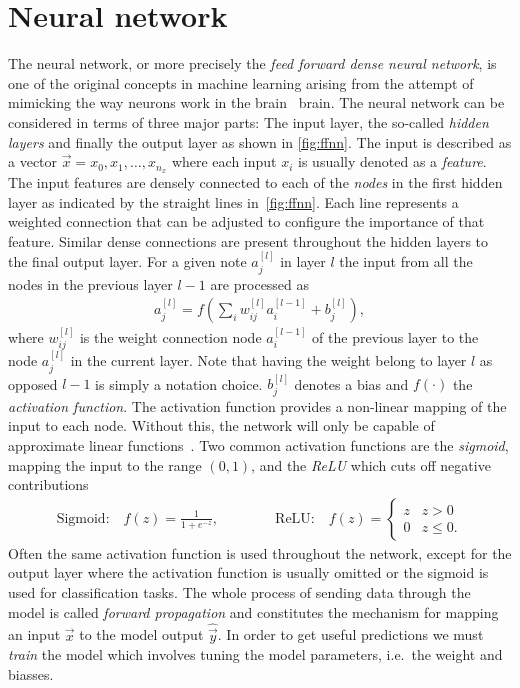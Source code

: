\section{Neural network}\label{sec:NN}
The neural network, or more precisely the \textit{feed forward dense neural
network}, is one of the original concepts in machine learning arising from the attempt of mimicking the way neurons work in the brain~\cite{lederer2021activation, Shankar_2022} brain. The neural network can be considered in terms of three major parts: The input layer, the
so-called \textit{hidden layers} and finally the output layer as shown in
\cref{fig:ffnn}. The input is described as a vector $\vec{x} = x_0, x_1, \ldots,
x_{n_x}$ where each input $x_i$ is usually denoted as a \textit{feature}. The
input features are densely connected to each of the \textit{nodes} in the first
hidden layer as indicated by the straight lines in~\cref{fig:ffnn}. Each line
represents a weighted connection that can be adjusted to configure the
importance of that feature. Similar dense connections are present throughout the
hidden layers to the final output layer. For a given note $a_j^{[l]}$ in layer $l$ the input from all the nodes in the previous layer $l-1$ are processed as
\begin{align*}
  a_j^{[l]} = f\left(\sum_i w^{[l]}_{ij}a_i^{[l-1]} + b_j^{[l]}\right),
\end{align*}
where $w^{[l]}_{ij}$ is the weight connection node $a_i^{[l-1]}$ of the previous layer to the node $a_j^{[l]}$ in the current layer. Note that having the weight belong to layer $l$ as opposed $l-1$ is simply a notation choice. $b_j^{[l]}$ denotes a bias and $f(\cdot)$ the \textit{activation function}. The activation function provides a non-linear mapping of the input to each node. Without this, the network will only be capable of approximate linear functions~\cite{lederer2021activation}. Two common activation functions are the \textit{sigmoid}, mapping the input to the range $(0,1)$, and the \textit{ReLU} which cuts off negative contributions
\begin{align*}
  \text{Sigmoid:} \quad f(z) = \frac{1}{1 + e^{-z}}, \qquad \qquad
  \text{ReLU:} \quad 
  f(z)= \begin{cases}
    z & z > 0   \\
    0 & z \leq 0.
    \end{cases}
\end{align*}
Often the same activation function is used throughout the network, except for the output layer where the activation function is usually omitted or the sigmoid is used for classification tasks. The whole process of sending data through the model is called \textit{forward propagation} and constitutes the mechanism for mapping an input $\vec{x}$ to the model output $\hat{\vec{y}}$. In order to get useful predictions we must \textit{train} the model which involves tuning the model parameters, i.e.\ the weight and biasses.
